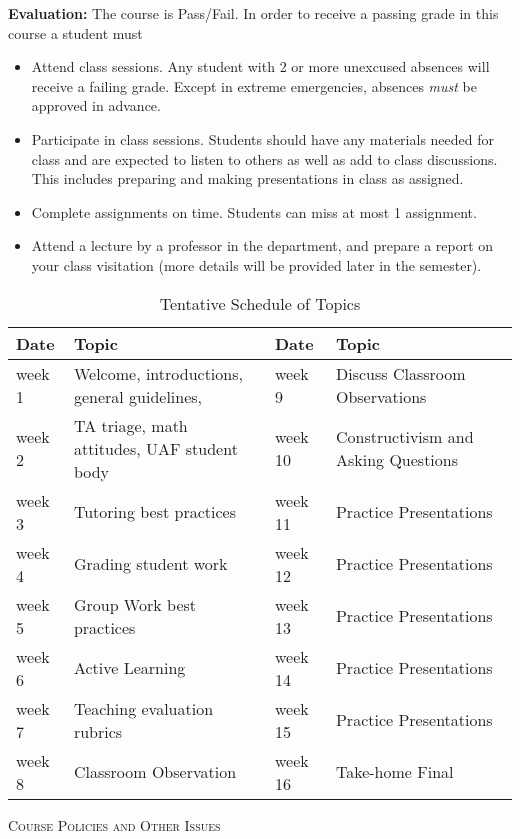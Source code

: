 \documentclass[12pt]{article}
\newcommand\bi{\begin{itemize}}
\newcommand\ei{\end{itemize}}
\begin{document}
\textbf{Evaluation:} The course is Pass/Fail. In order to receive a passing grade in this course a student must
\bi
\item Attend class sessions. Any student with 2 or more unexcused absences will receive a failing grade. Except in extreme emergencies, absences {\em must} be approved in advance. 
\item Participate in class sessions. Students should have any materials needed for class and are expected to listen to others as well as add to class discussions. This includes preparing and making presentations in class as assigned.
\item Complete assignments on time. Students can miss at most 1 assignment.
\item Attend a lecture by a professor in the department, and prepare a report on your class visitation (more details will be provided later in the semester).
\ei
\begin{table}[htp]
\caption*{Tentative Schedule of Topics }
\begin{center}
\begin{tabular}{l |p{2in}||l|p{2in}}
{Date}&{Topic}&{Date}&{Topic}\\
\hline\hline
week 1 & Welcome, introductions, general guidelines,&week 9 &Discuss Classroom Observations \\
week 2 & TA triage, math attitudes, UAF student body& week 10 & Constructivism and Asking Questions\\

week 3 & Tutoring best practices & week 11 & Practice Presentations \\
week 4 & Grading student work & week 12  & Practice Presentations \\
week 5 & Group Work best practices& week 13 & Practice Presentations\\
week 6 & Active Learning & week 14 & Practice Presentations\\
week 7& Teaching evaluation rubrics & week 15&  Practice Presentations \\
week 8 & Classroom Observation& week 16& Take-home Final\\
\end{tabular}
\end{center}
\label{default}
\end{table}%


\textsc{Course Policies and Other Issues}
\end{document}
